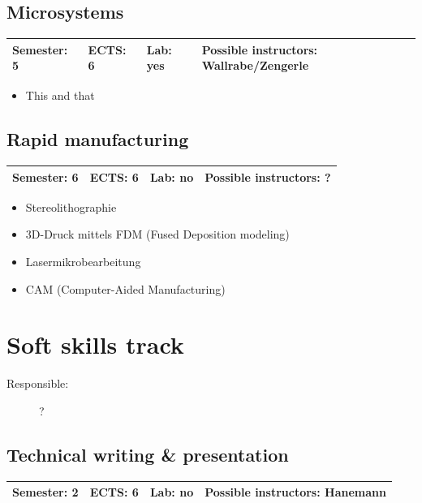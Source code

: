 \documentclass[12pt,twoside,fleqn,a4paper]{article}
\begin{document}
\subsection{Microsystems}
\begin{tabular}{llll} \hline
\textbf{Semester:} 5 & \textbf{ECTS:} 6 & \textbf{Lab:} yes & \textbf{Possible instructors:} Wallrabe/Zengerle\\
\hline
\end{tabular}

\begin{itemize}
\setlength\itemsep{0cm}
\item This and that
\end{itemize}


\subsection{Rapid manufacturing}
\begin{tabular}{llll} \hline
\textbf{Semester:} 6 & \textbf{ECTS:} 6 & \textbf{Lab:} no & \textbf{Possible instructors:} ?\\
\hline
\end{tabular}

\begin{itemize}
\setlength\itemsep{0cm}
\item Stereolithographie
\item 3D-Druck mittels FDM (Fused Deposition modeling)
\item Lasermikrobearbeitung
\item CAM (Computer-Aided Manufacturing)

\end{itemize}


\newpage
\section{Soft skills track}
\begin{description}
\item[Responsible:] ?
\end{description}
\vspace{1 mm}


\subsection{Technical writing \& presentation}
\begin{tabular}{llll} \hline
\textbf{Semester:} 2 & \textbf{ECTS:} 6 & \textbf{Lab:} no & \textbf{Possible instructors:} Hanemann\\
\hline
\end{tabular}
\end{document}
